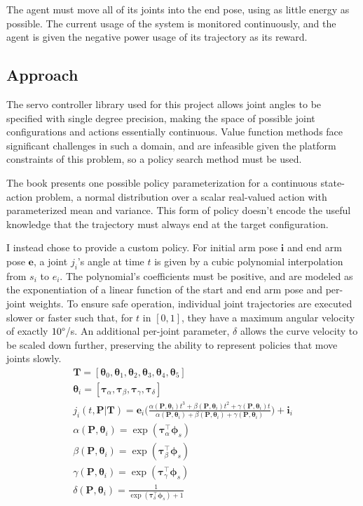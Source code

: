\documentclass{article}
\newcommand{\thetab}{\bm{\theta}}
\newcommand{\phib}{\bm{\phi}}
\newcommand{\bP}{\bm{P}}
\newcommand{\be}{\bm{e}}
\newcommand{\taub}{\bm{\tau}}
\newcommand{\sumparams}{\alpha(\bP,\thetab_i) + \beta(\bP, \thetab_i) + \gamma(\bP, \thetab_i) }
\begin{document}
The agent must move all of its joints into the end pose, using as little energy as possible. The current usage of the system is monitored continuously, and the agent is given the negative power usage of its trajectory as its reward.


\subsection{Approach}

The servo controller library used for this project allows joint angles to be specified with single degree precision, making the space of possible joint configurations and actions essentially continuous. Value function methods face significant challenges in such a domain, and are infeasible given the platform constraints of this problem, so a policy search method must be used.

The book presents one possible policy parameterization for a continuous state-action problem, a normal distribution over a scalar real-valued action with parameterized mean and variance. This form of policy doesn't encode the useful knowledge that the trajectory must always end at the target configuration.

I instead chose to provide a custom policy. For initial arm pose $\bm{i}$ and end arm pose $\bm{e}$, a joint $j_i$'s angle at time $t$ is given by a cubic polynomial interpolation from $s_i$ to $e_i$. The polynomial's coefficients must be positive, and are modeled as the exponentiation of a linear function of the start and end arm pose and per-joint weights. To ensure safe operation, individual joint trajectories are executed slower or faster such that, for $t$ in $[0,1]$, they have a maximum angular velocity of exactly $10\degree$/s. An additional per-joint parameter, $\delta$ allows the curve velocity to be scaled down further, preserving the ability to represent policies that move joints slowly.
\begin{gather}
	\bm{T} = [\thetab_0, \thetab_1, \thetab_2, \thetab_3, \thetab_4, \thetab_5]\\
	\thetab_i = [\taub_\alpha, \taub_\beta, \taub_\gamma, \taub_\delta] \\
	j_i(t, \bP | \bm{T}) = \be_i\bigg (\frac{\alpha(\bP,\thetab_i) t^3 + \beta(\bP, \thetab_i) t^2 + \gamma(\bP, \thetab_i) t}{\sumparams}\bigg) + \bm{i}_i\\
	\alpha(\bP,\thetab_i) = \exp(\taub_\alpha^\top \phib_s)\\
	\beta(\bP,\thetab_i) = \exp(\taub_\beta^\top \phib_s)\\
	\gamma(\bP,\thetab_i) = \exp(\taub_\gamma^\top \phib_s)\\	
	\delta(\bP,\thetab_i) = \frac{1}{\exp(\taub_\delta^\top \phib_s) + 1}
\end{gather}
\end{document}
